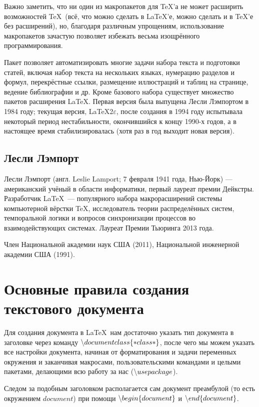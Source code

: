 \documentclass[12pt]{article}
\begin{document}
Важно заметить, что ни один из макропакетов для \TeX’а не может расширить возможностей \TeX~(всё, что можно сделать в \LaTeX’е, можно сделать и в \TeX’е без расширений), но, благодаря различным упрощениям, использование макропакетов зачастую позволяет избежать весьма изощрённого программирования.

Пакет позволяет автоматизировать многие задачи набора текста и подготовки статей, включая набор текста на нескольких языках, нумерацию разделов и формул, перекрёстные ссылки, размещение иллюстраций и таблиц на странице, ведение библиографии и др.
Кроме базового набора существует множество пакетов расширения \LaTeX.
Первая версия была выпущена Лесли Лэмпортом в 1984 году; текущая версия, \LaTeX2$\varepsilon$, после создания в 1994 году испытывала некоторый период нестабильности, окончившийся к концу 1990-х годов, а в настоящее время стабилизировалась (хотя раз в год выходит новая версия).

\subsection{Лесли Лэмпорт}

Лесли Лэмпорт (англ. Leslie Lamport; 7 февраля 1941 года, Нью-Йорк) — американский учёный в области информатики, первый лауреат премии Дейкстры.
Разработчик \LaTeX~— популярного набора макрорасширений системы компьютерной вёрстки \TeX, исследователь теории распределённых систем, темпоральной логики и вопросов синхронизации процессов во взаимодействующих системах.
Лауреат Премии Тьюринга 2013 года.

Член Национальной академии наук США (2011), Национальной инженерной академии США (1991).

\section{Основные правила создания текстового документа}

Для создания документа в \LaTeX~нам достаточно указать тип документа в заголовке через команду $\char`\\documentclass\{*class*\}$, после чего мы можем указать все настройки документа, начиная от форматирования и задачи переменных окружения и заканчивая макросами, пользовательскими командами и целыми пакетами, делающими всю работу за нас ($\char`\\usepackage$).

Следом за подобным заголовком располагается сам документ преамбулой (то есть окружением $document$) при помощи $\char`\\begin\{document\}$ и $\char`\\end\{document\}$.
\end{document}
